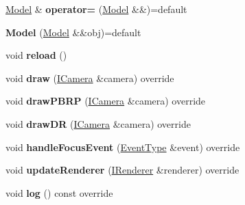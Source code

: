 \begin{DoxyCompactItemize}
\item 
\hyperlink{classflw_1_1flf_1_1Model}{Model} \& {\bfseries operator=} (\hyperlink{classflw_1_1flf_1_1Model}{Model} \&\&)=default\hypertarget{classflw_1_1flf_1_1Model_a1b070368285cca4a99b9749b9cde74d6}{}\label{classflw_1_1flf_1_1Model_a1b070368285cca4a99b9749b9cde74d6}

\item 
{\bfseries Model} (\hyperlink{classflw_1_1flf_1_1Model}{Model} \&\&obj)=default\hypertarget{classflw_1_1flf_1_1Model_ac9e9ca4164ca96cd4a0c373f7c0cc0a9}{}\label{classflw_1_1flf_1_1Model_ac9e9ca4164ca96cd4a0c373f7c0cc0a9}

\item 
void {\bfseries reload} ()\hypertarget{classflw_1_1flf_1_1Model_a98eea53380bf63f1d9555e55aefb9fce}{}\label{classflw_1_1flf_1_1Model_a98eea53380bf63f1d9555e55aefb9fce}

\item 
void {\bfseries draw} (\hyperlink{classflw_1_1flf_1_1ICamera}{I\+Camera} \&camera) override\hypertarget{classflw_1_1flf_1_1Model_a33409f7997ffc520cd0de10e1622659b}{}\label{classflw_1_1flf_1_1Model_a33409f7997ffc520cd0de10e1622659b}

\item 
void {\bfseries draw\+P\+B\+RP} (\hyperlink{classflw_1_1flf_1_1ICamera}{I\+Camera} \&camera) override\hypertarget{classflw_1_1flf_1_1Model_aed705f08ce1c14655adf57e6a383b91d}{}\label{classflw_1_1flf_1_1Model_aed705f08ce1c14655adf57e6a383b91d}

\item 
void {\bfseries draw\+DR} (\hyperlink{classflw_1_1flf_1_1ICamera}{I\+Camera} \&camera) override\hypertarget{classflw_1_1flf_1_1Model_a6b1f0f8aa0af922b24283c85690eeecb}{}\label{classflw_1_1flf_1_1Model_a6b1f0f8aa0af922b24283c85690eeecb}

\item 
void {\bfseries handle\+Focus\+Event} (\hyperlink{classflw_1_1flf_1_1EventType}{Event\+Type} \&event) override\hypertarget{classflw_1_1flf_1_1Model_a327fdd03d161b29eb050657e74d3494f}{}\label{classflw_1_1flf_1_1Model_a327fdd03d161b29eb050657e74d3494f}

\item 
void {\bfseries update\+Renderer} (\hyperlink{classflw_1_1flf_1_1IRenderer}{I\+Renderer} \&renderer) override\hypertarget{classflw_1_1flf_1_1Model_a2dc3e1aa1d2d3d923987cfc4a06a5137}{}\label{classflw_1_1flf_1_1Model_a2dc3e1aa1d2d3d923987cfc4a06a5137}

\item 
void {\bfseries log} () const override\hypertarget{classflw_1_1flf_1_1Model_ac17d4806eff1a0166efcb62be9a7eca0}{}\label{classflw_1_1flf_1_1Model_ac17d4806eff1a0166efcb62be9a7eca0}

\end{DoxyCompactItemize}
